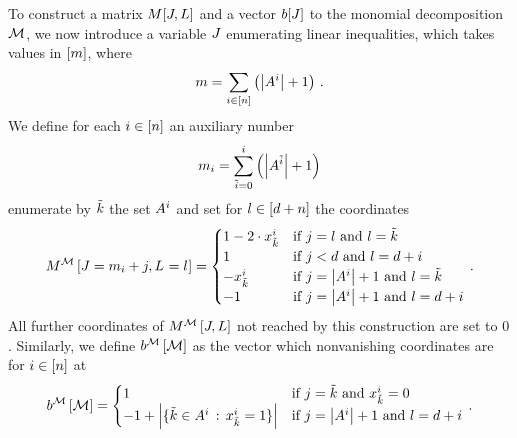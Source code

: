 To construct a matrix $M[J,L]$ and a vector $b[J]$ to the monomial decomposition $\mathcal{M}$, we now introduce a variable $J$ enumerating linear inequalities, which takes values in $[m]$, where
\[ m =  \sum_{i\in[n]} \left(\left|A^{i}\right| +1\right) \, . \]
We define for each $i\in[n]$ an auxiliary number
\[ m_{i} = \sum_{\tilde{i}=0}^{i} \left(\left|A^{\tilde{i}}\right| +1\right) \]
enumerate by $\tilde{k}$ the set $A^{i}$ and set for $l\in[d+n]$ the coordinates
\begin{align}
    \label{eq:ilpMatrix}
    \matrixofat{\sliceset}{\datvariable=\datanum_{\decindex}+\datindex,\indexedselvariable} =
    \begin{cases}
        1 - 2 \cdot  \catindexof{\seccatenumerator}^{\decindex} & \text{if }  \datindex = \selindex  \text{ and } \selindex = \seccatenumerator   \\ %
        1 & \text{if } \datindex < \catorder  \text{ and } \selindex=\catorder+\decindex \\ %
        -\catindexof{\seccatenumerator}^{\decindex} & \text{if }  \datindex = \cardof{\variablesetof{\decindex}} + 1   \text{ and }  \selindex=\seccatenumerator  \\ %
        -1 & \text{if }  \datindex = \cardof{\variablesetof{\decindex}} + 1  \text{ and }  \selindex = \catorder + \decindex \\ %
    \end{cases} \, .
\end{align}
All further coordinates of $M^{\mathcal{M}}\left[J,L\right]$ not reached by this construction are set to $0$.
Similarly, we define $b^{\mathcal{M}}\left[\mathcal{M}\right]$ as the vector which nonvanishing coordinates are for $i\in[n]$ at
\begin{align}
    \label{eq:ilpRhs}
    \rhsofat{\sliceset}{\datvariable=\datanum_{\decindex}+\datindex} =
    \begin{cases}
        1 & \text{if }  \datindex = \seccatenumerator \text{ and } \catindexof{\seccatenumerator}^{\decindex} = 0 \\ %
        -1 + \cardof{\{\seccatenumerator\in\variablesetof{\decindex} \, : \,  \catindexof{\seccatenumerator}^{\decindex} = 1\}}  & \text{if }  \datindex = \cardof{\variablesetof{\decindex}} + 1  \text{ and }  \selindex = \catorder + \decindex \\ %
    \end{cases} \, .
\end{align}


